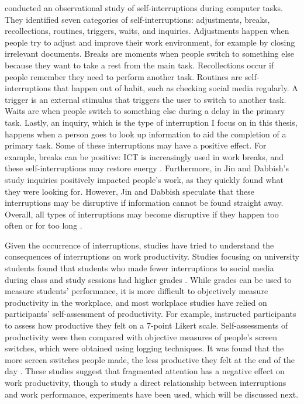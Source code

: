 \citet{Jin2009} conducted an observational study of self-interruptions during computer tasks. They identified seven categories of self-interruptions: adjustments, breaks, recollections, routines, triggers, waits, and inquiries. Adjustments happen when people try to adjust and improve their work environment, for example by closing irrelevant documents. Breaks are moments when people switch to something else because they want to take a rest from the main task. Recollections occur if people remember they need to perform another task. Routines are self-interruptions that happen out of habit, such as checking social media regularly. A trigger is an external stimulus that triggers the user to switch to another task. Waits are when people switch to something else during a delay in the primary task. Lastly, an inquiry, which is the type of interruption I focus on in this thesis, happens when a person goes to look up information to aid the completion of a primary task. Some of these interruptions may have a positive effect. For example, breaks can be positive: ICT is increasingly used in work breaks, and these self-interruptions may restore energy \citep{Skatova2016}. Furthermore, in Jin and Dabbish's study inquiries positively impacted people's work, as they quickly found what they were looking for. However, Jin and Dabbish speculate that these interruptions may be disruptive if information cannot be found straight away. Overall, all types of interruptions may become disruptive if they happen too often or for too long \citep{Mark2018}.

Given the occurrence of interruptions, studies have tried to understand the consequences of interruptions on work productivity. Studies focusing on university students found that students who made fewer interruptions to social media during class and study sessions had higher grades \citep{Carrier2015}. While grades can be used to measure students' performance, it is more difficult to objectively measure productivity in the workplace, and most workplace studies have relied on participants' self-assessment of productivity. For example, \citet{Mark2015} instructed participants to assess how productive they felt on a 7-point Likert scale. %
Self-assessments of productivity were then compared with objective measures of people's screen switches, which were obtained using logging techniques. It was found that the more screen switches people made, the less productive they felt at the end of the day \citep{Mark2015}. 
These studies suggest that fragmented attention has a negative effect on work productivity, though to study a direct relationship between interruptions and work performance, experiments have been used, which will be discussed next. 

